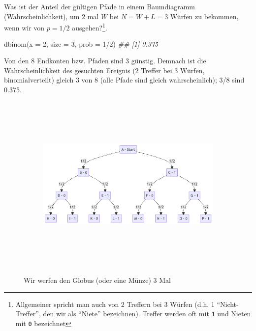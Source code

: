 \documentclass[
  a4paper,
  DIV=11]{scrreprt}
\newenvironment{Shaded}{\begin{snugshade}}{\end{snugshade}}
\newcommand{\AttributeTok}[1]{\textcolor[rgb]{0.40,0.45,0.13}{#1}}
\newcommand{\DecValTok}[1]{\textcolor[rgb]{0.68,0.00,0.00}{#1}}
\newcommand{\DocumentationTok}[1]{\textcolor[rgb]{0.37,0.37,0.37}{\textit{#1}}}
\newcommand{\FunctionTok}[1]{\textcolor[rgb]{0.28,0.35,0.67}{#1}}
\newcommand{\NormalTok}[1]{\textcolor[rgb]{0.00,0.23,0.31}{#1}}
\newcommand{\SpecialCharTok}[1]{\textcolor[rgb]{0.37,0.37,0.37}{#1}}
\theoremstyle{definition}
\theoremstyle{remark}
\begin{document}
Was ist der Anteil der gültigen Pfade in einem Baumdiagramm
(Wahrscheinlichkeit), um 2 mal \(W\) bei \(N=W+L=3\) Würfen zu bekommen,
wenn wir von \(p=1/2\) ausgehen?\footnote{Allgemeiner spricht man auch
  von 2 Treffern bei 3 Würfen (d.h. 1 ``Nicht-Treffer'', den wir als
  ``Niete'' bezeichnen). Treffer werden oft mit \texttt{1} und Nieten
  mit \texttt{0} bezeichnet}.

\begin{Shaded}
\begin{Highlighting}[]
\FunctionTok{dbinom}\NormalTok{(}\AttributeTok{x =} \DecValTok{2}\NormalTok{, }\AttributeTok{size =} \DecValTok{3}\NormalTok{, }\AttributeTok{prob =} \DecValTok{1}\SpecialCharTok{/}\DecValTok{2}\NormalTok{)}
\DocumentationTok{\#\# [1] 0.375}
\end{Highlighting}
\end{Shaded}

Von den 8 Endkonten bzw. Pfaden sind 3 günstig. Demnach ist die
Wahrscheinlichkeit des gesuchten Ereignis (2 Treffer bei 3 Würfen,
binomialverteilt) gleich 3 von 8 (alle Pfade sind gleich
wahrscheinlich); 3/8 sind 0.375.

\begin{figure}

{\centering 

\begin{figure}[H]

{\centering \includegraphics[width=5.5in,height=3.5in]{./Globusversuch_files/figure-latex/mermaid-figure-2.png}

}

\end{figure}

}

\caption{\label{fig-binom1}Wir werfen den Globus (oder eine Münze) 3
Mal}

\end{figure}
\end{document}

